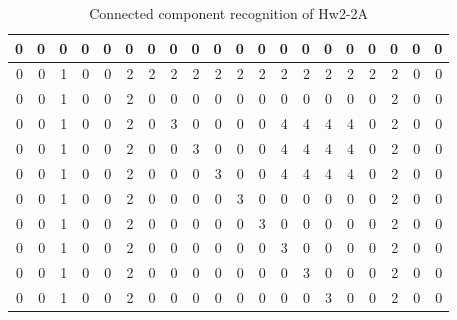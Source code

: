 \documentclass[a4paper]{article}
\begin{document}
\begin{table}[h]
	\centering
	\caption{Connected component recognition of Hw2-2A}
	\begin{tabular}{|r|r|r|r|r|r|r|r|r|r|r|r|r|r|r|r|r|r|r|r|}
		\hline
		0     & 0     & 0     & 0     & 0     & 0     & 0     & 0     & 0     & 0     & 0     & 0     & 0     & 0     & 0     & 0     & 0     & 0     & 0     & 0 \bigstrut\\
		\hline
		0     & 0     & 1     & 0     & 0     & 2     & 2     & 2     & 2     & 2     & 2     & 2     & 2     & 2     & 2     & 2     & 2     & 2     & 0     & 0 \bigstrut\\
		\hline
		0     & 0     & 1     & 0     & 0     & 2     & 0     & 0     & 0     & 0     & 0     & 0     & 0     & 0     & 0     & 0     & 0     & 2     & 0     & 0 \bigstrut\\
		\hline
		0     & 0     & 1     & 0     & 0     & 2     & 0     & 3     & 0     & 0     & 0     & 0     & 4     & 4     & 4     & 4     & 0     & 2     & 0     & 0 \bigstrut\\
		\hline
		0     & 0     & 1     & 0     & 0     & 2     & 0     & 0     & 3     & 0     & 0     & 0     & 4     & 4     & 4     & 4     & 0     & 2     & 0     & 0 \bigstrut\\
		\hline
		0     & 0     & 1     & 0     & 0     & 2     & 0     & 0     & 0     & 3     & 0     & 0     & 4     & 4     & 4     & 4     & 0     & 2     & 0     & 0 \bigstrut\\
		\hline
		0     & 0     & 1     & 0     & 0     & 2     & 0     & 0     & 0     & 0     & 3     & 0     & 0     & 0     & 0     & 0     & 0     & 2     & 0     & 0 \bigstrut\\
		\hline
		0     & 0     & 1     & 0     & 0     & 2     & 0     & 0     & 0     & 0     & 0     & 3     & 0     & 0     & 0     & 0     & 0     & 2     & 0     & 0 \bigstrut\\
		\hline
		0     & 0     & 1     & 0     & 0     & 2     & 0     & 0     & 0     & 0     & 0     & 0     & 3     & 0     & 0     & 0     & 0     & 2     & 0     & 0 \bigstrut\\
		\hline
		0     & 0     & 1     & 0     & 0     & 2     & 0     & 0     & 0     & 0     & 0     & 0     & 0     & 3     & 0     & 0     & 0     & 2     & 0     & 0 \bigstrut\\
		\hline
		0     & 0     & 1     & 0     & 0     & 2     & 0     & 0     & 0     & 0     & 0     & 0     & 0     & 0     & 3     & 0     & 0     & 2     & 0     & 0 \bigstrut\\

\end{tabular}
\end{table}
\end{document}
